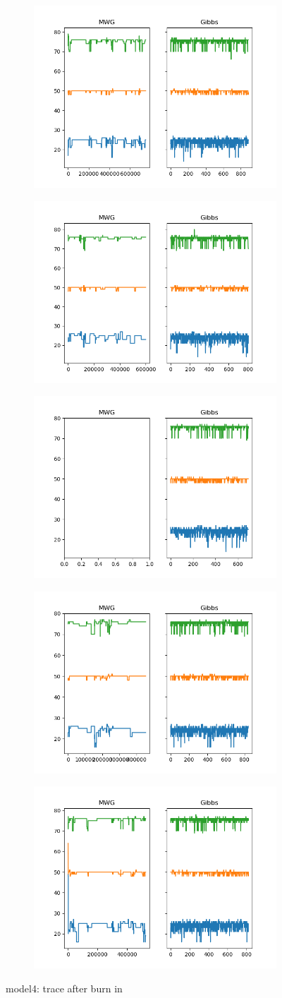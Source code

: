 \begin{figure}[H]
    \centering
    \begin{subfigure}
    	\centering
        \includegraphics[width=0.3\linewidth]{../../plots/Trace_post_burnin_M4_N100_NMCMC3_seed0_diffind2.png}
    \end{subfigure}
    \begin{subfigure}
        \centering
    	\includegraphics[width=0.3\linewidth]{../../plots/Trace_post_burnin_M4_N100_NMCMC3_seed1_diffind2.png}
	\end{subfigure}
	\begin{subfigure}
	    \centering
    	\includegraphics[width=0.3\linewidth]{../../plots/Trace_post_burnin_M4_N100_NMCMC3_seed2_diffind2.png}
	\end{subfigure}
	\begin{subfigure}
	    \centering
    	\includegraphics[width=0.3\linewidth]{../../plots/Trace_post_burnin_M4_N100_NMCMC3_seed3_diffind2.png}
	\end{subfigure}
	\begin{subfigure}
	    \centering
    	\includegraphics[width=0.3\linewidth]{../../plots/Trace_post_burnin_M4_N100_NMCMC3_seed4_diffind2.png}
	\end{subfigure}
	\caption{model4: trace after burn in}
\end{figure}

